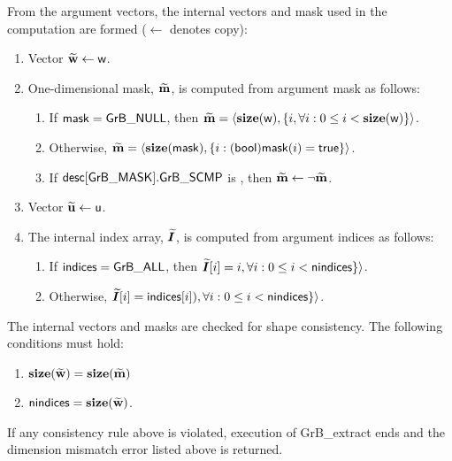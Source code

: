 From the argument vectors, the internal vectors and mask used in 
the computation are formed ($\leftarrow$ denotes copy):
\begin{enumerate}
	\item Vector ${\bf \widetilde{w}} \leftarrow {\sf w}$.

	\item One-dimensional mask, ${\bf \widetilde{m}}$, is computed from 
    argument {\sf mask} as follows:
	\begin{enumerate}
		\item	If ${\sf mask} = {\sf GrB\_NULL}$, then ${\bf \widetilde{m}} = 
        \langle \bold{size}({\sf w}), \{i, \forall i : 0 \leq i < 
        \bold{size}({\sf w}) \} \rangle$.

		\item	Otherwise, ${\bf \widetilde{m}} = 
        \langle \bold{size}({\sf mask}), \{i : ({\sf bool}){\sf mask}(i) = 
        {\sf true}\} \rangle$.

		\item	If ${\sf desc[GrB\_MASK].GrB\_SCMP}$ is \true, then ${\bf \widetilde{m}} \leftarrow \neg {\bf \widetilde{m}}$.
	\end{enumerate}

	\item Vector ${\bf \widetilde{u}} \leftarrow {\sf u}$.
    
        \item The internal index array, $\bm{\widetilde{I}}$, is computed from argument {\sf indices} as follows:
	\begin{enumerate}
		\item	If ${\sf indices} = {\sf GrB\_ALL}$, then $\bm{\widetilde{I}}[i] = i                , \forall i : 0 \leq i < {\sf nindices} \} \rangle$.

		\item	Otherwise,                                $\bm{\widetilde{I}}[i] = {\sf indices}[i]), \forall i : 0 \leq i < {\sf nindices} \} \rangle$.
        \end{enumerate}
\end{enumerate}

The internal vectors and masks are checked for shape consistency. The following 
conditions must hold:
\begin{enumerate}
	\item $\bold{size}({\bf \widetilde{w}}) = \bold{size}({\bf \widetilde{m}})$
    \item ${\sf nindices} = \bold{size}({\bf \widetilde{w}})$.
\end{enumerate}
If any consistency rule above is violated, execution of {\sf GrB\_extract} ends and 
the dimension mismatch error listed above is returned.

